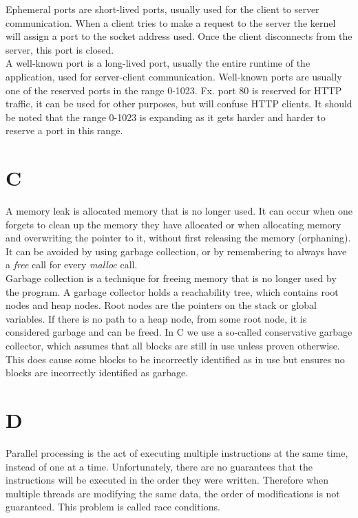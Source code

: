 \documentclass[11pt]{report}
\begin{document}
Ephemeral ports are short-lived ports, usually used for the client to server communication. When a client tries to make a request to the server the kernel will assign a port to the socket address used. Once the client disconnects from the server, this port is closed.\\[1ex]

A well-known port is a long-lived port, usually the entire runtime of the application, used for server-client communication. Well-known ports are usually one of the reserved ports in the range 0-1023. Fx. port 80 is reserved for HTTP traffic, it can be used for other purposes, but will confuse HTTP clients. It should be noted that the range 0-1023 is expanding as it gets harder and harder to reserve a port in this range\cite{reserved-ports}.\\[1ex] 

\section{C}
A memory leak is allocated memory that is no longer used. It can occur when one forgets to clean up the memory they have allocated or when allocating memory and overwriting the pointer to it, without first releasing the memory (orphaning). It can be avoided by using garbage collection, or by remembering to always have a \textit{free} call for every \textit{malloc} call.\\[1ex]

Garbage collection is a technique for freeing memory that is no longer used by the program. A garbage collector holds a reachability tree, which contains root nodes and heap nodes. Root nodes are the pointers on the stack or global variables. If there is no path to a heap node, from some root node, it is considered garbage and can be freed. In C we use a so-called conservative garbage collector, which assumes that all blocks are still in use unless proven otherwise. This does cause some blocks to be incorrectly identified as in use but ensures no blocks are incorrectly identified as garbage.\\[1ex]

\section{D}
Parallel processing is the act of executing multiple instructions at the same time, instead of one at a time. Unfortunately, there are no guarantees that the instructions will be executed in the order they were written. Therefore when multiple threads are modifying the same data, the order of modifications is not guaranteed. This problem is called race conditions.\\[1ex]
\end{document}

